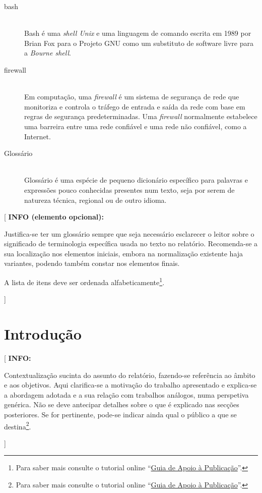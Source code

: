 \documentclass[11pt,a4paper]{report}
\newenvironment{info}[1]{\vspace*{6mm}\color{blue}[ \textbf{INFO:} \begin{em} #1}
                        {\vspace*{3mm}\end{em} ]}
\newenvironment{infoopt}[1]{\vspace*{6mm}\color{blue}[ \textbf{INFO (elemento opcional):} \begin{em} #1}
                        {\vspace*{3mm}\end{em} ]}
\begin{document}
\begin{description}
\item[bash] \hfill \\
  Bash é uma \emph{shell Unix} e uma linguagem de comando escrita 
  em 1989 por Brian Fox para o Projeto GNU como um substituto de 
  software livre para a \emph{Bourne shell}.
\item[firewall] \hfill \\
  Em computação, uma \emph{firewall} é um sistema de segurança de rede 
  que monitoriza e controla o tráfego de entrada e saída da rede 
  com base em regras de segurança predeterminadas.
  Uma \emph{firewall} normalmente estabelece uma barreira entre uma 
  rede confiável e uma rede não confiável, como a Internet.
\item[Glossário] \hfill \\
  Glossário é uma espécie de pequeno dicionário específico para
  palavras e expressões pouco conhecidas presentes num texto, seja
  por serem de natureza técnica, regional ou de outro idioma.
\end{description}

\begin{infoopt}
Justifica-se ter um glossário sempre que seja necessário esclarecer o leitor sobre o significado de terminologia específica usada no texto no relatório.
Recomenda-se a sua localização nos elementos iniciais, embora na
normalização existente haja variantes, podendo também constar nos
elementos finais.

A lista de itens deve ser ordenada alfabeticamente\footnote{%
Para saber mais consulte o tutorial online 
``\href{https://docs.google.com/document/d/1TDC1behVq8x7fQL4CcPEEh_np5GXviJevQxnQ9gbiJs/edit}
{Guia de Apoio à Publicação}''.}.
\end{infoopt}


\chapter{Introdução}

\pagestyle{fancy}
\setcounter{page}{1}

\begin{info}
Contextualização sucinta do assunto do relatório, fazendo-se
referência ao âmbito e aos objetivos.
Aqui clarifica-se a motivação do trabalho apresentado e explica-se a
abordagem adotada e a sua relação com trabalhos análogos, numa
perspetiva genérica.
Não se deve antecipar detalhes sobre o que é explicado nas secções
posteriores. 
Se for pertinente, pode-se indicar ainda qual o público a que se
destina\footnote{%
Para saber mais consulte o tutorial online 
``\href{https://docs.google.com/document/d/1TDC1behVq8x7fQL4CcPEEh_np5GXviJevQxnQ9gbiJs/edit}
{Guia de Apoio à Publicação}''.}.
\end{info}
\end{document}
